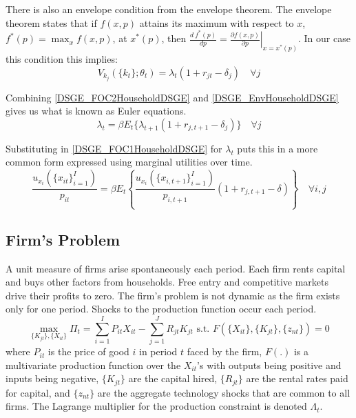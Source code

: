 \documentclass[letterpaper,12pt]{article}
\theoremstyle{definition}
\begin{document}
\begin{spacing}{1.5}
		There is also an envelope condition from the envelope theorem. The envelope theorem states that if $f(x,p)$ attains its maximum with respect to $x$, $f^*(p) = \max_x f(x,p)$, at $x^*(p)$, then $\frac{d\>f^*(p)}{dp} =\left. \frac{\partial  f(x,p)}{\partial p}\right|_{x=x^*(p)}$. In our case this condition this implies:
		\begin{equation}\label{DSGE_EnvHouseholdDSGE}
		V_{k_j}(\{k_t\};\theta_t) = \lambda_t(1+r_{jt}-\delta_j)\quad \forall j
		\end{equation}

		Combining \eqref{DSGE_FOC2HouseholdDSGE} and \eqref{DSGE_EnvHouseholdDSGE} gives us what is known as Euler equations.
		\begin{equation}
		\lambda_t  = \beta E_t\{\lambda_{t+1}(1+r_{j,t+1}-\delta_j)\}\quad \forall j
		\end{equation}

		Substituting in \eqref{DSGE_FOC1HouseholdDSGE} for $\lambda_t$ puts this in a more common form expressed using marginal utilities over time.
		\begin{equation}\label{DSGE_Euler2HouseholdDSGE}
		\dfrac{u_{x_i}(\{x_{it}\}_{i=1}^I)}{p_{it}}  = \beta E_t\left\{\dfrac{u_{x_i}(\{x_{i,t+1}\}_{i=1}^I)}{p_{i,t+1}} (1+r_{j,t+1}-\delta)\right\} \quad \forall i,j
		\end{equation}

	\subsection{Firm's Problem}\label{DSGE_FirmDSGE}
		A unit measure of firms arise spontaneously each period. Each firm rents capital and buys other factors from households. Free entry and competitive markets drive their profits to zero. The firm's problem is not dynamic as the firm exists only for one period. Shocks to the production function occur each period.
		\begin{equation}
		\max_{\{K_{jt}\},\{X_{it}\}} \Pi_t = \sum_{i=1}^I P_{it}X_{it} - \sum_{j=1}^J R_{jt}K_{jt} \text{ s.t. } F(\{X_{it}\},\{K_{jt}\},\{z_{nt}\}) = 0 \nonumber
		\end{equation}
		where $P_{it}$ is the price of good $i$ in period $t$ faced by the firm, $F(.)$ is a multivariate production function over the $X_{it}$'s with outputs being positive and inputs being negative, $\{K_{jt}\}$ are the capital hired, $\{R_{jt}\}$ are the rental rates paid for capital, and $\{z_{nt}\}$ are the aggregate technology shocks that are common to all firms. The Lagrange multiplier for the production constraint is denoted $\Lambda_t$.


\end{spacing}
\end{document}
